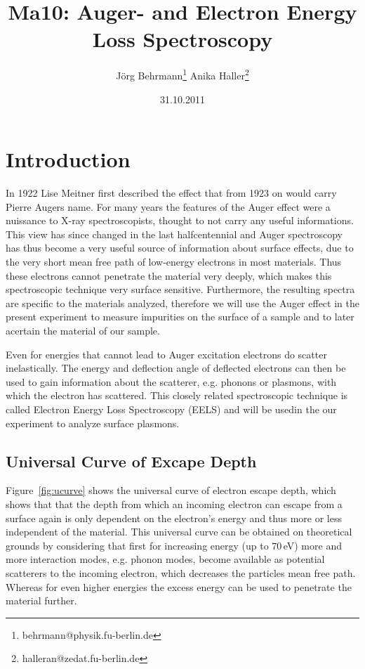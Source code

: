 \documentclass[a4paper,10pt]{scrartcl}
\begin{document}
\title{Ma10: Auger- and Electron Energy Loss Spectroscopy}
\author{J\"org Behrmann\footnote{behrmann@physik.fu-berlin.de} \qquad Anika Haller\footnote{halleran@zedat.fu-berlin.de}}
\date{31.10.2011}
\maketitle
\tableofcontents
\thispagestyle{empty}


\section{Introduction}

In 1922 Lise Meitner first described the effect that from 1923 on would carry Pierre Augers name. For many years the features of the Auger effect were a nuissance to X-ray spectroscopists, thought to not carry any useful informations. This view has since changed in the last halfcentennial and Auger spectroscopy has thus become a very useful source of information about surface effects, due to the very short mean free path of low-energy electrons in most materials. Thus these electrons cannot penetrate the material very deeply, which makes this spectroscopic technique very surface sensitive. Furthermore, the resulting spectra are specific to the materials analyzed, therefore we will use the Auger effect in the present experiment to measure impurities on the surface of a sample and to later acertain the material of our sample.

Even for energies that cannot lead to Auger excitation electrons do scatter inelastically. The energy and deflection angle of deflected electrons can then be used to gain information about the scatterer, e.g. phonons or plasmons, with which the electron has scattered. This closely related spectroscopic technique is called Electron Energy Loss Spectroscopy (EELS) and will be usedin the our experiment to analyze surface plasmons.

\subsection{Universal Curve of Excape Depth}

Figure~\ref{fig:ucurve} shows the universal curve of electron escape depth, which shows that that the depth from which an incoming electron can escape from a surface again is only dependent on the electron's energy and thus more or less independent of the material. This universal curve can be obtained on theoretical grounds by considering that first for increasing energy (up to $70\,$eV) more and more interaction modes, e.g. phonon modes, become available as potential scatterers to the incoming electron, which decreases the particles mean free path. Whereas for even higher energies the excess energy can be used to penetrate the material further.
\end{document}

